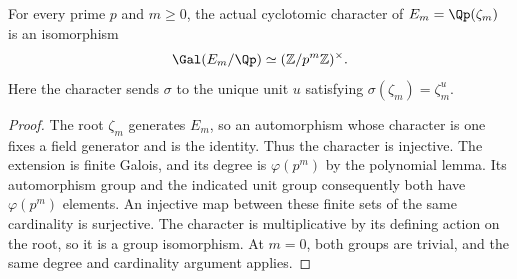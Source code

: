 \begin{lemma}
\label{ft:finite-cyclotomic-character}
\leanok
For every prime $p$ and $m\geq0$, the actual cyclotomic character
of $E_m=\Qp(\zeta_m)$ is an isomorphism
\[
 \Gal(E_m/\Qp)\simeq(\mathbb Z/p^m\mathbb Z)^\times.
\]
Here the character sends $\sigma$ to the unique unit $u$ satisfying
$\sigma(\zeta_m)=\zeta_m^u$.
\end{lemma}
\begin{proof}
The root $\zeta_m$ generates $E_m$, so an automorphism whose
character is one fixes a field generator and is the identity.
Thus the character is injective. The extension is finite Galois,
and its degree is $\varphi(p^m)$ by the polynomial lemma.
Its automorphism group and the indicated unit group consequently
both have $\varphi(p^m)$ elements. An injective map between these
finite sets of the same cardinality is surjective. The character
is multiplicative by its defining action on the root, so it is
a group isomorphism. At $m=0$, both groups are trivial, and the
same degree and cardinality argument applies.
\end{proof}

